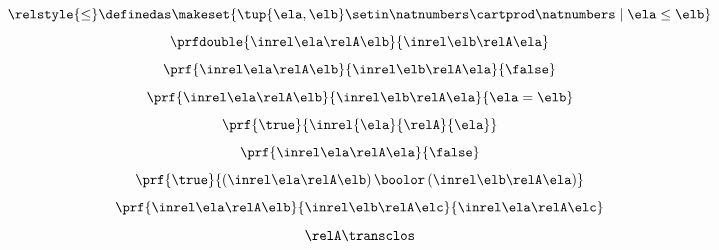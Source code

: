 {\begin{forslides}
\begin{equation}
        \end{equation}
        \begin{equation}
            \label{eq:slides_session2_rel_149}
            \relstyle{\leq} \definedas  \makeset{\tup{\ela,\elb}\setin \natnumbers\cartprod \natnumbers\mid \ela \leq \elb}
        \end{equation}
        \begin{equation}
            \label{eq:slides_session2_rel_150}
            \prfdouble{
                \inrel \ela \relA \elb
            }{
                \inrel \elb \relA \ela
            }
        \end{equation}
        \begin{equation}
            \label{eq:slides_session2_rel_151}
            \prf{
                \inrel \ela \relA \elb
            }{
                \inrel \elb \relA \ela
            }{
                \false
            }
        \end{equation}
        \begin{equation}
            \label{eq:slides_session2_rel_152}
            \prf{
                \inrel \ela \relA \elb
            }{
                \inrel \elb \relA \ela
            }{
                \ela = \elb
            }
        \end{equation}
        \begin{equation}
            \label{eq:slides_session2_rel_153}
            \prf{\true}{\inrel{\ela}{\relA}{\ela}}
        \end{equation}
        \begin{equation}
            \label{eq:slides_session2_rel_154}
            \prf{
                \inrel \ela \relA \ela
            }{
                \false
            }
        \end{equation}
        \begin{equation}
            \label{eq:slides_session2_rel_155}
            \prf{
                \true
            }{
                (\inrel\ela\relA\elb )\,\boolor\, (\inrel\elb\relA\ela)
            }
        \end{equation}
        \begin{equation}
            \label{eq:slides_session2_rel_156}
            \prf{
                \inrel \ela \relA \elb
            }{
                \inrel \elb \relA \elc
            }{
                \inrel \ela \relA \elc
            }
        \end{equation}
        \begin{equation}
            \label{eq:slides_session2_rel_157}
            \relA\transclos
        \end{equation}


\end{forslides}}
